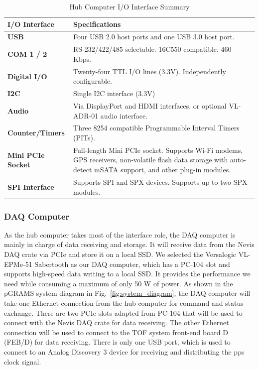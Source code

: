 \begin{table}
\centering
\begin{tabular}{@{}p{3cm}p{10cm}@{}}
\toprule
\textbf{I/O Interface} & \textbf{Specifications} \\
\midrule
\textbf{USB} & Four USB 2.0 host ports and one USB 3.0 host port. \\
\addlinespace
\textbf{COM 1 / 2} & RS-232/422/485 selectable. 16C550 compatible. 460 Kbps. \\
\addlinespace
\textbf{Digital I/O} & Twenty-four TTL I/O lines (3.3V). Independently configurable. \\
\addlinespace
\textbf{I2C} & Single I2C interface (3.3V) \\
\addlinespace
\textbf{Audio} & Via DisplayPort and HDMI interfaces, or optional VL-ADR-01 audio interface. \\
\addlinespace
\textbf{Counter/Timers} & Three 8254 compatible Programmable Interval Timers (PITs). \\
\textbf{Mini PCIe Socket} & Full-length Mini PCIe socket. Supports Wi-Fi modems, GPS receivers, non-volatile flash data storage with auto-detect mSATA support, and other plug-in modules. \\
\addlinespace
\textbf{SPI Interface} & Supports SPI and SPX devices. Supports up to two SPX modules. \\
\bottomrule
\end{tabular}
\caption{Hub Computer I/O Interface Summary}
\label{tab:hub_io_summary}
\end{table}

\subsubsection{DAQ Computer}
\label{chap:GRAMS:pGRAMS:computer:daq}
As the hub computer takes most of the interface role, the DAQ computer is mainly in charge of data receiving and storage. It will receive data from the Nevis DAQ crate via PCIe and store it on a local SSD. We selected the Versalogic VL-EPMe-51 Sabertooth \cite{versalogic_sabertooth} as our DAQ computer, which has a PC-104 slot and supports high-speed data writing to a local SSD. It provides the performance we need while consuming a maximum of only 50 W of power.
As shown in the pGRAMS system diagram in Fig.~\ref{fig:system_diagram}, the DAQ computer will take one Ethernet connection from the hub computer for command and status exchange. There are two \ac{PCIe} slots adapted from PC-104 that will be used to connect with the Nevis DAQ crate for data receiving. The other Ethernet connection will be used to connect to the \ac{TOF} system front-end board D (FEB/D) for data receiving. There is only one USB port, which is used to connect to an Analog Discovery 3 device \cite{digilent_ad3} for receiving and distributing the \ac{pps} clock signal.


